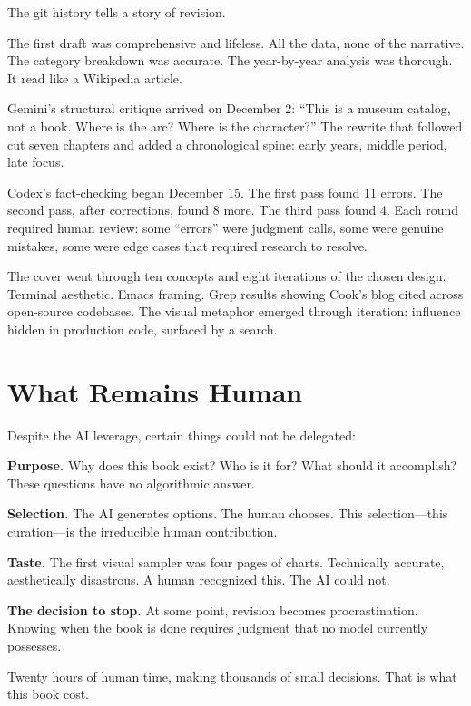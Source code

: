 The git history tells a story of revision.

The first draft was comprehensive and lifeless. All the data, none of the narrative. The category breakdown was accurate. The year-by-year analysis was thorough. It read like a Wikipedia article.

Gemini's structural critique arrived on December 2: ``This is a museum catalog, not a book. Where is the arc? Where is the character?'' The rewrite that followed cut seven chapters and added a chronological spine: early years, middle period, late focus.

Codex's fact-checking began December 15. The first pass found 11 errors. The second pass, after corrections, found 8 more. The third pass found 4. Each round required human review: some ``errors'' were judgment calls, some were genuine mistakes, some were edge cases that required research to resolve.

The cover went through ten concepts and eight iterations of the chosen design. Terminal aesthetic. Emacs framing. Grep results showing Cook's blog cited across open-source codebases. The visual metaphor emerged through iteration: influence hidden in production code, surfaced by a search.

\bigskip

\section*{What Remains Human}

Despite the AI leverage, certain things could not be delegated:

\textbf{Purpose.} Why does this book exist? Who is it for? What should it accomplish? These questions have no algorithmic answer.

\textbf{Selection.} The AI generates options. The human chooses. This selection---this curation---is the irreducible human contribution.

\textbf{Taste.} The first visual sampler was four pages of charts. Technically accurate, aesthetically disastrous. A human recognized this. The AI could not.

\textbf{The decision to stop.} At some point, revision becomes procrastination. Knowing when the book is done requires judgment that no model currently possesses.

Twenty hours of human time, making thousands of small decisions. That is what this book cost.

\bigskip

